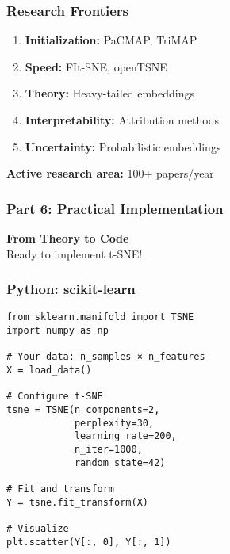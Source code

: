 \documentclass[aspectratio=169]{beamer}
\begin{document}
\begin{frame}
\frametitle{Research Frontiers}

\begin{enumerate}
\item \textbf{Initialization:} PaCMAP, TriMAP
\item \textbf{Speed:} FIt-SNE, openTSNE
\item \textbf{Theory:} Heavy-tailed embeddings
\item \textbf{Interpretability:} Attribution methods
\item \textbf{Uncertainty:} Probabilistic embeddings
\end{enumerate}

\vspace{0.3cm}
\textbf{Active research area:} 100+ papers/year

\end{frame}

\begin{frame}
\frametitle{Part 6: Practical Implementation}

\begin{center}
\LARGE{\textbf{From Theory to Code}}\\[1cm]

Ready to implement t-SNE!
\end{center}

\end{frame}

\begin{frame}[fragile]
\frametitle{Python: scikit-learn}

\begin{verbatim}
from sklearn.manifold import TSNE
import numpy as np

# Your data: n_samples × n_features
X = load_data()

# Configure t-SNE
tsne = TSNE(n_components=2,
            perplexity=30,
            learning_rate=200,
            n_iter=1000,
            random_state=42)

# Fit and transform
Y = tsne.fit_transform(X)

# Visualize
plt.scatter(Y[:, 0], Y[:, 1])
\end{verbatim}

\end{frame}
\end{document}
